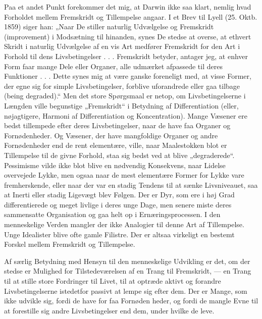 \documentclass[12pt,a4paper,openany]{book}
\newcommand{\opage}[1]{\marginnote{\footnotesize\textit{[#1]}}}
\begin{document}
\setcounter{footnote}{0}%
\opage{226}Paa et andet Punkt forekommer det mig, at Darwin ikke
saa klart, nemlig hvad Forholdet mellem Fremskridt og Tillempelse
angaar. I et Brev til Lyell (25. Oktb. 1859) siger han:
„Naar De stiller naturlig Udvælgelse og Fremskridt (improvement)
i Modsætning til hinanden, synes De stedse at overse,
at ethvert Skridt i naturlig Udvælgelse af en vis Art medfører
Fremskridt for den Art i Forhold til dens Livsbetingelser . . .
Fremskridt betyder, antager jeg, at enhver Form faar mange
Dele eller Organer, alle udmærket afpassede til deres Funktioner . . .
Dette synes mig at være ganske foreneligt med, at
visse Former, der egne sig for simple Livsbetingelser, forblive
uforandrede eller gaa tilbage (being degraded).“ Men det store
Spørgsmaal er netop, om Livsbetingelserne i Længden ville begunstige
„Fremskridt“ i Betydning af Differentiation (eller, nøjagtigere,
Harmoni af Differentiation og Koncentration). Mange
Væsener ere bedst tillempede efter deres Livsbetingelser, naar
de have faa Organer og Fornødenheder. Og Væsener, der
have mangfoldige Organer og andre Fornødenheder end de rent
elementære, ville, naar Maalestokken blot er Tillempelse til de
givne Forhold, staa sig bedst ved at blive „degraderede“. Pessimisme
vilde ikke blot blive en nødvendig Konsekvens, naar
Lidelse overvejede Lykke, men ogsaa naar de mest elementære
Former for Lykke vare fremherskende, eller naar der var en
stadig Tendens til at sænke Livsniveauet, saa at Inerti eller
stadig Ligevægt blev Følgen. Der er Dyr, som ere i høj Grad
differentierede og meget livlige i deres unge Dage, men senere
miste deres sammensatte Organisation og gaa helt op i Ernæringsprocessen.
I den menneskelige Verden mangler der ikke
Analogier til denne Art af Tillempelse. Unge Idealister blive
ofte gamle Filistre. Der er altsaa virkeligt en bestemt Forskel
mellem Fremskridt og Tillempelse.

Af særlig Betydning med Hensyn til den menneskelige
Udvikling er det, om der stedse er Mulighed for Tilstedeværelsen
af en Trang til Fremskridt, --- en Trang til at stille store
Fordringer til Livet, til at optræde aktivt og forandre Livsbetingelserne
istedetfor passivt at lempe sig efter dem. Der er
Mange, som ikke udvikle sig, fordi de have for faa Fornøden%
\setcounter{footnote}{0}%
\opage{227}heder, og fordi de mangle Evne til at forestille sig andre Livsbetingelser
end dem, under hvilke de leve.
\end{document}
